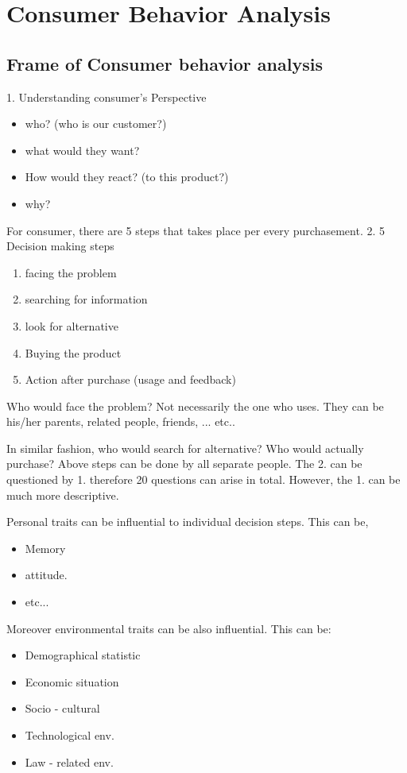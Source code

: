 \documentclass[12pt]{article}
\begin{document}
\section{Consumer Behavior Analysis}
\subsection{Frame of Consumer behavior analysis}
1. Understanding consumer's Perspective
\begin{itemize}
	\item who? (who is our customer?)
	\item what would they want?
	\item How would they react? (to this product?)
	\item why?
\end{itemize}

For consumer, there are 5 steps that takes place per every purchasement.
2. 5 Decision making steps
\begin{enumerate}
	\item facing the problem
	\item searching for information
	\item look for alternative
	\item Buying the product
	\item Action after purchase (usage and feedback)
\end{enumerate}

Who would face the problem? Not necessarily the one who uses. They can be his/her parents, related people, friends, ... etc..

In similar fashion, who would search for alternative? Who would actually purchase? Above steps can be done by all separate people.
The 2. can be questioned by 1. therefore 20 questions can arise in total. However, the 1. can be much more descriptive.

Personal traits can be influential to individual decision steps. This can be,
\begin{itemize}
	\item Memory
	\item attitude.
	\item etc...
\end{itemize}

Moreover environmental traits can be also influential. This can be:
\begin{itemize}
	\item Demographical statistic
	\item Economic situation
	\item Socio - cultural
	\item Technological env.
	\item Law - related env.
\end{itemize}
\end{document}
